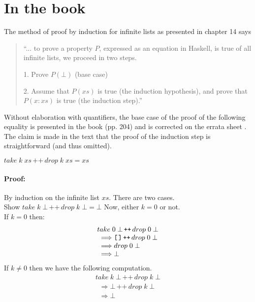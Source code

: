 \documentclass[11pt]{article}
\newcommand{\append}{\,{\texttt{++}}\,}
\newcommand{\nil}{{\texttt{[{\hspace{.125em}}]}}}
\begin{document}
\section{In the book}

The method of proof by induction for infinite lists as presented in chapter 14
says \em
\begin{quote}
``... to prove a property $P$, expressed as an equation in Haskell, is true of
all infinite lists, we proceed in two steps.
\begin{description}
\item{1.} Prove $P(\bot)$ (base case)
\item{2.} Assume that $P(xs)$ is true (the induction hypothesis), and prove that $P(x:xs)$ is true (the induction step).''

\end{description}

\end{quote}
\rm

Without elaboration with quantifiers, the base case of the proof of the
following equality is presented in the book (pp. 204) and is corrected on the
errata sheet \cite{hudak_errata}.  The claim is made in the text that the proof
of the induction step is straightforward (and thus omitted).

\begin{theorem}
$take\; k\; xs \append drop\; k\; xs = xs$
\end{theorem}
\paragraph{Proof:} By induction on the infinite list $xs$. There are two cases.
\\
 Show  $take\; k\; \bot \append drop\; k\; \bot = \bot$
Now, either $k=0$ or not. \\
If $k=0$ then:
\[\begin{array}{l}
take \; 0 \; \bot \append drop\; 0\; \bot   \\
\;\;\Longrightarrow \nil \append{} drop \; 0 \; \bot \\
\;\;\Longrightarrow drop \; 0 \; \bot \\
\;\;\Longrightarrow \bot
\end{array}\]
If $k \not= 0$ then we have the following computation.
\[\begin{array}{l}
take \; k \; \bot \append drop\; k\; \bot \\
\;\;\Longrightarrow \bot \append{} drop \; k \; \bot \\
\;\;\Longrightarrow \bot
\end{array}\]
\end{document}
